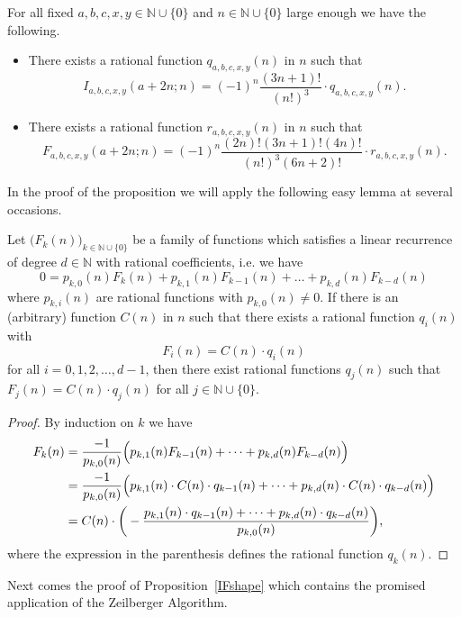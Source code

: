\documentclass{amsart}
\numberwithin{equation}{section}
\newcommand*{\N}{\mathbb{N}}
\begin{document}
\begin{prop}\label{IFshape}
    For all fixed $a,b,c,x,y\in \N\cup\{0\}$ and $n\in \N\cup\{0\}$ large enough we have the following.
    \begin{itemize}
        \item[(i)] There exists a rational function $q_{a,b,c,x,y}(n)$ in $n$ such that
        \[I_{a,b,c,x,y}(a+2n;n)=(-1)^n\frac{(3n+1)!}{(n!)^3}\cdot q_{a,b,c,x,y}(n).\]
        \item[(ii)] There exists a rational function $r_{a,b,c,x,y}(n)$ in $n$ such that
        \[F_{a,b,c,x,y}(a+2n;n)=(-1)^n\frac{(2n)!(3n+1)!(4n)!}{(n!)^3 (6n+2)!}\cdot r_{a,b,c,x,y}(n).\]
    \end{itemize}
\end{prop}

In the proof of the proposition we will apply the following easy lemma at several occasions.

\begin{lem} \label{recpreserv}
    Let $\big(F_k(n)\big)_{k\in\N\cup\{0\}}$ be a family of functions which satisfies a linear recurrence of degree $d\in\N$ with rational coefficients, i.e. we have
    \[0=p_{k,0}(n)F_k(n)+p_{k,1}(n)F_{k-1}(n)+\dots +p_{k,d}(n)F_{k-d}(n)\]
    where $p_{k,i}(n)$ are rational functions with $p_{k,0}(n)\neq 0$. If there is an (arbitrary) function $C(n)$ in $n$ such that there exists a rational function $q_i(n)$ with
    \[F_i(n)=C(n)\cdot q_i(n)\]
    for all $i=0,1,2,\dots, d-1$, then there exist rational functions $q_j(n)$ such that \\$F_j(n)=C(n)\cdot q_j(n)$ for all $j\in \N\cup\{0\}$.
\end{lem}

\begin{proof}
    By induction on $k$ we have
    \begin{align}
        F_k(n)&=\frac{-1}{p_{k,0}(n)}\Big(p_{k,1}(n)F_{k-1}(n)+\dots +p_{k,d}(n)F_{k-d}(n)\Big)\notag\\
        &=\frac{-1}{p_{k,0}(n)}\Big(p_{k,1}(n)\cdot C(n)\cdot q_{k-1}(n)+\dots +p_{k,d}(n)\cdot C(n)\cdot q_{k-d}(n)\Big)\notag\\
        &=C(n)\cdot\bigg(-\frac{p_{k,1}(n)\cdot q_{k-1}(n)+\dots +p_{k,d}(n)\cdot q_{k-d}(n)}{p_{k,0}(n)}\bigg),\notag
    \end{align}
    where the expression in the parenthesis defines the rational function $q_k(n)$.
\end{proof}

Next comes the proof of Proposition~\ref{IFshape} which contains the promised application of the Zeilberger Algorithm.
\end{document}
